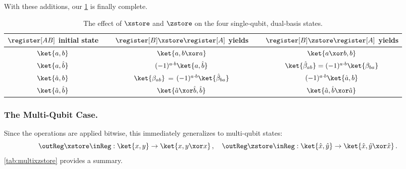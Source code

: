         With these additions, our \cref{tab:xzstore} is finally complete.

      \begin{table}[h!]
        \caption{
          \label{tab:xzstore}
          The effect of $\xstore$ and $\zstore$ 
          on the four single-qubit, dual-basis states.
        }
        \centering
        \setlength{\extrarowheight}{2pt}
          \begin{tabular}{ccc}
            \toprule
            $\register[AB]$ initial state & 
              $\quad$ $\register[B] \xstore \register[A]$ yields $\quad$ & 
              $\register[B] \zstore \register[A]$ yields\\
            \midrule
            $\ket{a,b}$ & $\ket{a,b \xor a}$ & $\ket{a \xor b, b}$ \\
            $\ket{a,\hat b}$ & $(-1)^{a \cdot b}\ket{a, \hat b}$ & $\ket{\hat{\beta}_{ab}} = (-1)^{a \cdot b}\ket{\beta_{ba}}$ \\
            $\ket{\hat a, b}$ & $\ket{\beta_{ab}}$ = $(-1)^{a \cdot b}\ket{\hat{\beta}_{ba}}$ & $(-1)^{a \cdot b}\ket{\hat a, b}$ \\
            $\ket{\hat a, \hat b}$ & $\ket{\hat a \xor \hat b, \hat b}$ & $\ket{\hat a, \hat b \xor \hat a}$ \\
            \bottomrule
          \end{tabular}
      \end{table}

    \subsubsection{The Multi-Qubit Case.}
      Since the operations are applied bitwise, this
        immediately generalizes to multi-qubit states:
      \[
        \outReg \xstore \inReg : \ket{x,y} \to \ket{x, y \xor x}\, ,
        \quad
        \outReg \zstore \inReg : \ket{\hat x, \hat y} \to \ket{\hat x, \hat y \xor \hat x}\, .
      \]
      \cref{tab:multixzstore} provides a summary.

